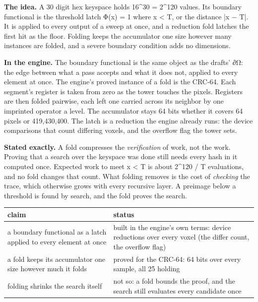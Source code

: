 \textbf{The idea.} A 30 digit hex keyspace holds 16\textasciicircum{}30 = 2\textasciicircum{}120 values. Its boundary functional is the threshold latch Φ(x) = 1 where x < T, or the distance |x − T|. It is applied to every output of a sweep at once, and a reduction fold latches the first hit as the floor. Folding keeps the accumulator one size however many instances are folded, and a severe boundary condition adds no dimensions.

\textbf{In the engine.} The boundary functional is the same object as the drafts' ∂Ω: the edge between what a pass accepts and what it does not, applied to every element at once. The engine's proved instance of a fold is the CRC-64. Each segment's register is taken from zero as the tower touches the pixels. Registers are then folded pairwise, each left one carried across its neighbor by one imprinted operator a level. The accumulator stays 64 bits whether it covers 64 pixels or 419,430,400. The latch is a reduction the engine already runs: the device comparisons that count differing voxels, and the overflow flag the tower sets.

\textbf{Stated exactly.} A fold compresses the \emph{verification} of work, not the work. Proving that a search over the keyspace was done still needs every hash in it computed once. Expected work to meet x < T is about 2\textasciicircum{}120 / T evaluations, and no fold changes that count. What folding removes is the cost of \emph{checking} the trace, which otherwise grows with every recursive layer. A preimage below a threshold is found by search, and the fold proves the search.

{\small
\setlength{\tabcolsep}{6pt}
\begin{longtable}{>{\RaggedRight\arraybackslash}p{}>{\RaggedRight\arraybackslash}p{}}
\toprule
claim & status \\
\midrule
\endhead
a boundary functional as a latch applied to every element at once & built in the engine's own terms: device reductions over every voxel (the differ count, the overflow flag) \\
a fold keeps its accumulator one size however much it folds & proved for the CRC-64: 64 bits over every sample, all 25 holding \\
folding shrinks the search itself & not so: a fold bounds the proof, and the search still evaluates every candidate once \\
\bottomrule
\end{longtable}
}

